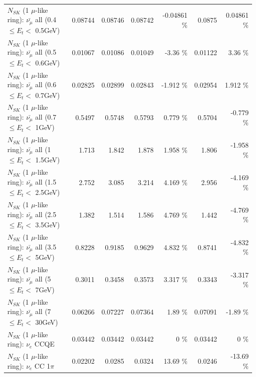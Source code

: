 \begin{table}
\begin{tabular}{| l | r | r | r  r | r  r |}
 $N_{SK}$ (1 $\mu$-like ring): $\bar{\nu_{\mu}}$ all (0.4 $\leq E_{t} <$ 0.5GeV) &         0.08744 &         0.08746 &         0.08742 & -0.04861 \%  &          0.0875 &  0.04861 \%  \\ 
 $N_{SK}$ (1 $\mu$-like ring): $\bar{\nu_{\mu}}$ all (0.5 $\leq E_{t} <$ 0.6GeV) &         0.01067 &         0.01086 &         0.01049 &    -3.36 \%  &         0.01122 &     3.36 \%  \\ 
 $N_{SK}$ (1 $\mu$-like ring): $\bar{\nu_{\mu}}$ all (0.6 $\leq E_{t} <$ 0.7GeV) &         0.02825 &         0.02899 &         0.02843 &   -1.912 \%  &         0.02954 &    1.912 \%  \\ 
   $N_{SK}$ (1 $\mu$-like ring): $\bar{\nu_{\mu}}$ all (0.7 $\leq E_{t} <$ 1GeV) &          0.5497 &          0.5748 &          0.5793 &    0.779 \%  &          0.5704 &   -0.779 \%  \\ 
   $N_{SK}$ (1 $\mu$-like ring): $\bar{\nu_{\mu}}$ all (1 $\leq E_{t} <$ 1.5GeV) &           1.713 &           1.842 &           1.878 &    1.958 \%  &           1.806 &   -1.958 \%  \\ 
 $N_{SK}$ (1 $\mu$-like ring): $\bar{\nu_{\mu}}$ all (1.5 $\leq E_{t} <$ 2.5GeV) &           2.752 &           3.085 &           3.214 &    4.169 \%  &           2.956 &   -4.169 \%  \\ 
 $N_{SK}$ (1 $\mu$-like ring): $\bar{\nu_{\mu}}$ all (2.5 $\leq E_{t} <$ 3.5GeV) &           1.382 &           1.514 &           1.586 &    4.769 \%  &           1.442 &   -4.769 \%  \\ 
   $N_{SK}$ (1 $\mu$-like ring): $\bar{\nu_{\mu}}$ all (3.5 $\leq E_{t} <$ 5GeV) &          0.8228 &          0.9185 &          0.9629 &    4.832 \%  &          0.8741 &   -4.832 \%  \\ 
     $N_{SK}$ (1 $\mu$-like ring): $\bar{\nu_{\mu}}$ all (5 $\leq E_{t} <$ 7GeV) &          0.3011 &          0.3458 &          0.3573 &    3.317 \%  &          0.3343 &   -3.317 \%  \\ 
    $N_{SK}$ (1 $\mu$-like ring): $\bar{\nu_{\mu}}$ all (7 $\leq E_{t} <$ 30GeV) &         0.06266 &         0.07227 &         0.07364 &     1.89 \%  &         0.07091 &    -1.89 \%  \\ 
\hline
\hline
\hline
                                      $N_{SK}$ (1 $\mu$-like ring): $\nu_e$ CCQE &         0.03442 &         0.03442 &         0.03442 &        0 \%  &         0.03442 &        0 \%  \\ 
                                 $N_{SK}$ (1 $\mu$-like ring): $\nu_e$ CC 1$\pi$ &         0.02202 &          0.0285 &          0.0324 &    13.69 \%  &          0.0246 &   -13.69 \%  \\ 

\end{tabular}
\end{table}
